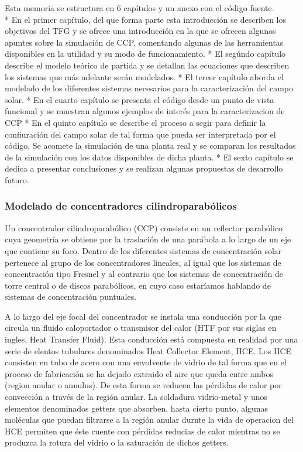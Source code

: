 Esta memoria se estructura en 6 capítulos y un anexo con el código
fuente.\\
* En el primer capítulo, del que forma parte esta introducción se
describen los objetivos del TFG y se ofrece una introducción en la que
se ofrecen algunos apuntes sobre la simulación de CCP, comentando
algunas de las herramientas disponibles en la utilidad y su modo de
funcionamiento. * El segúndo capítulo describe el modelo teórico de
partida y se detallan las ecuaciones que describen los sistemas que más
adelante serán modelados. * El tercer capítulo aborda el modelado de los
diferentes sistemas necesarios para la caracterización del campo solar.
* En el cuarto capítulo se presenta el código desde un punto de vista
funcional y se muestran algunos ejemplos de interés para la
caracterizacion de CCP * En el quinto capítulo se describe el proceso a
segir para definir la confiuración del campo solar de tal forma que
pueda ser interpretada por el código. Se acomete la simulación de una
planta real y se comparan los resultados de la simulación con los datos
disponibles de dicha planta. * El sexto capítulo se dedica a presentar
conclusiones y se realizan algunas propuestas de desarrollo futuro.

\hypertarget{modelado-de-concentradores-cilindroparabuxf3licos}{%
\subsubsection{Modelado de concentradores
cilindroparabólicos}\label{modelado-de-concentradores-cilindroparabuxf3licos}}

Un concentrador cilindroparabólico (CCP) consiste en un reflector
parabólico cuya geometría se obtiene por la traslación de una parábola a
lo largo de un eje que contiene su foco. Dentro de los diferentes
sistemas de concentración solar pertenece al grupo de los concentradores
lineales, al igual que los sistemas de concentración tipo Fresnel y al
contrario que los sistemas de concentración de torre central o de discos
parabólicos, en cuyo caso estaríamos hablando de sistemas de
concentración puntuales.

A lo largo del eje focal del concentrador se instala una conducción por
la que circula un fluido caloportador o transmisor del calor (HTF por
sus siglas en ingles, Heat Transfer Fluid). Esta conducción está
compuesta en realidad por una serie de elentos tubulares denominados
Heat Collector Element, HCE. Los HCE consisten en tubo de acero con una
envolvente de vidrio de tal forma que en el proceso de fabricación se ha
dejado extraido el aire que queda entre ambos (region anular o annulus).
De esta forma se reducen las pérdidas de calor por convección a través
de la región anular. La soldadura vidrio-metal y unos elementos
denominados getters que absorben, hasta cierto punto, algunas moléculas
que puedan filtrarse a la región anular durnte la vida de operacion del
HCE permiten que éste cuente con pérdidas reducias de calor mientras no
se produzca la rotura del vidrio o la saturación de dichos getters.

